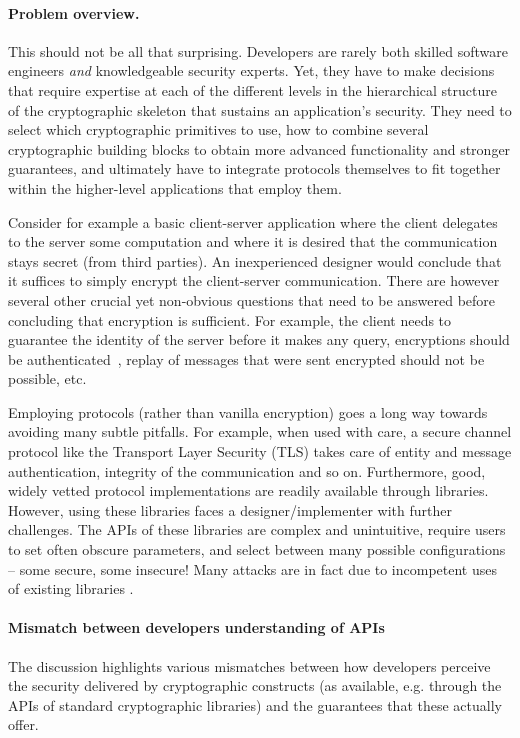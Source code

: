 \documentclass[10pt]{article}
\begin{document}
\paragraph*{Problem overview.}

This should not be all that surprising.   Developers are rarely both skilled software engineers \emph{and} knowledgeable security experts.
Yet, they have to make decisions that require expertise at each of the different levels in the hierarchical structure of the cryptographic skeleton that sustains an application's security.
They need to select which cryptographic primitives to use, how to combine several cryptographic building blocks to obtain more advanced functionality and stronger guarantees, and ultimately have to integrate protocols themselves to fit together within the higher-level applications that employ them.


Consider for example a basic client-server application where the client delegates to the server some computation and where it is desired that the communication stays secret (from third parties).
An inexperienced designer would conclude that it suffices to simply encrypt the client-server communication. 
There are however several other crucial yet non-obvious questions that need to be answered before concluding that  encryption is sufficient. 
For example, the client needs to guarantee the identity of the server before it makes any query, encryptions should be authenticated~\cite{BN08}, replay of messages that were sent encrypted should not be possible, etc. 

Employing protocols (rather than vanilla encryption) goes a long way towards avoiding many subtle pitfalls.  
For example, when used with care, a secure channel protocol like the Transport Layer Security (TLS) takes care of entity and message authentication, integrity of the communication and so on.  Furthermore, good, widely vetted protocol implementations are readily available through libraries.  However, using these libraries faces a designer/implementer with further challenges.   The APIs of these libraries are complex and unintuitive, require users to set often obscure parameters, and select between many possible configurations -- some secure, some insecure!  Many attacks are in fact due to incompetent uses of existing libraries  \cite{GIJABS12}. 

\paragraph{Mismatch between developers understanding of APIs}
The discussion highlights various mismatches between how developers perceive the security delivered by cryptographic constructs (as available, e.g. through the APIs of standard cryptographic libraries) and the guarantees that these actually offer. 
\end{document}
